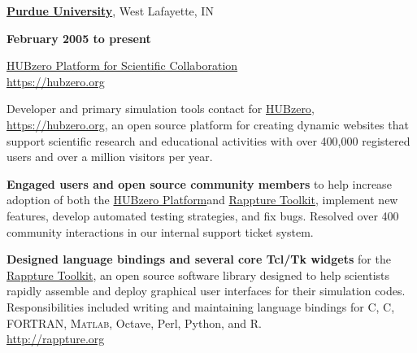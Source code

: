 \documentclass[10pt]{article}
\renewcommand\textit[1]{\underline{\smash{#1}}}
\newcommand{\halfblankline}{\quad\vspace{-0.5\baselineskip}\pagebreak[3]}
\providecommand\Matlab{\textsc{Matlab}}
\newcommand\CC{C\nolinebreak[4]\hspace{-.05em}\raisebox{.4ex}{\relsize{-3}{\textbf{++}}}}
\newcommand\HUBZEROPLATFORM{\href{https://hubzero.org}{HUBzero Platform}}
\newcommand\HUBZEROREGISTERED{\href{https://hubzero.org}{HUBzero\textsuperscript{\textregistered}}}
\newcommand\HUBZEROPLATFORMSCICOL{\href{https://hubzero.org}{HUBzero Platform for Scientific Collaboration}}
\newcommand\RAPPTURE{\href{http://rappture.org}{Rappture Toolkit}}
\begin{document}
\href{http://www.purdue.edu/}{\textbf{Purdue University}},
West Lafayette, IN
\begin{outerlist}

    \item[] \textit{Software Engineer}%
            \hfill \textbf{February 2005 to present}
    \item[] \HUBZEROPLATFORMSCICOL \\
        \url{https://hubzero.org}

        Developer and primary simulation tools contact for
        \HUBZEROREGISTERED, \url{https://hubzero.org}, an open source
        platform for creating dynamic websites that support scientific
        research and educational activities with over 400,000
        registered users and over a million visitors per year.

        \halfblankline

        \begin{innerlist}

            \item \textbf{Engaged users and open source community members} to help
                increase adoption of both the \HUBZEROPLATFORM \space and \RAPPTURE,
                implement new features, develop automated testing
                strategies, and fix bugs. Resolved over 400 community
                interactions in our internal support ticket system.

            \halfblankline

             \item \textbf{Designed language bindings and several core Tcl/Tk widgets}
                for the \RAPPTURE, an open source software library designed to help
                scientists rapidly assemble and deploy graphical user interfaces for
                their simulation codes. Responsibilities included writing and maintaining
                language bindings for C, \CC, FORTRAN, \Matlab, Octave, Perl, Python,
                and R. \\
                \url{http://rappture.org}


            \halfblankline


\end{innerlist}
\end{outerlist}
\end{document}
